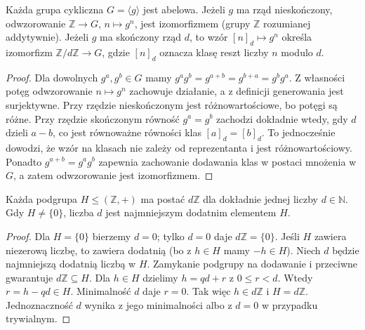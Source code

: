 \begin{twierdzenie}
\label{aa:tw:grupy-cykliczne}
Każda grupa cykliczna $G=\langle g\rangle$ jest abelowa.
Jeżeli $g$ ma rząd nieskończony, odwzorowanie
$\mathbb Z\to G$, $n\mapsto g^n$, jest izomorfizmem
(grupy $\mathbb Z$ rozumianej addytywnie).
Jeżeli $g$ ma skończony rząd $d$, to wzór
$[n]_d\mapsto g^n$ określa izomorfizm
$\mathbb Z/d\mathbb Z\to G$, gdzie
$[n]_d$ oznacza klasę reszt liczby $n$ modulo $d$.
\end{twierdzenie}
\begin{proof}
Dla dowolnych $g^a,g^b\in G$ mamy
$g^ag^b=g^{a+b}=g^{b+a}=g^bg^a$.
Z własności potęg odwzorowanie $n\mapsto g^n$ zachowuje działanie,
a z definicji generowania jest surjektywne. Przy rzędzie
nieskończonym jest różnowartościowe, bo potęgi są różne.
Przy rzędzie skończonym równość $g^a=g^b$ zachodzi dokładnie
wtedy, gdy $d$ dzieli $a-b$, co jest równoważne równości klas
$[a]_d=[b]_d$. To jednocześnie dowodzi, że wzór na klasach
nie zależy od reprezentanta i jest różnowartościowy.
Ponadto $g^{a+b}=g^ag^b$ zapewnia zachowanie dodawania klas
w postaci mnożenia w $G$, a zatem odwzorowanie jest izomorfizmem.
\end{proof}

\begin{lemat}
\label{aa:lem:podgrupy-z}
Każda podgrupa $H\le(\mathbb Z,+)$ ma postać $d\mathbb Z$
dla dokładnie jednej liczby $d\in\mathbb N$.
Gdy $H\ne\{0\}$, liczba $d$ jest najmniejszym dodatnim elementem $H$.
\end{lemat}
\begin{proof}
Dla $H=\{0\}$ bierzemy $d=0$; tylko $d=0$ daje $d\mathbb Z=\{0\}$.
Jeśli $H$ zawiera niezerową liczbę, to zawiera dodatnią
(bo z $h\in H$ mamy $-h\in H$). Niech $d$ będzie najmniejszą
dodatnią liczbą w $H$. Zamykanie podgrupy na dodawanie i
przeciwne gwarantuje $d\mathbb Z\subseteq H$.
Dla $h\in H$ dzielimy $h=qd+r$ z $0\le r<d$.
Wtedy $r=h-qd\in H$. Minimalność $d$ daje $r=0$.
Tak więc $h\in d\mathbb Z$ i $H=d\mathbb Z$.
Jednoznaczność $d$ wynika z jego minimalności albo z $d=0$
w przypadku trywialnym.
\end{proof}


